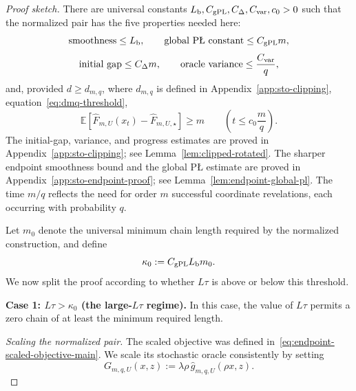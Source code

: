\documentclass[11pt]{article}
\newcommand{\E}{\mathbb{E}}
\begin{document}
\begin{proof}[Proof sketch]
There are universal constants \(L_{\rm b},C_{\mathrm{gPL}},C_\Delta,C_{\rm var},c_0>0\) such that the normalized pair has
the five properties needed here:
\begin{equation}
\label{eq:endpoint-normalized-geometry-main}
\text{smoothness}\le L_{\rm b},
\qquad
\text{global P\L{} constant}\le C_{\mathrm{gPL}}m,
\end{equation}
\begin{equation}
\label{eq:endpoint-normalized-oracle-main}
\text{initial gap}\le C_\Delta m,
\qquad
\text{oracle variance}\le \frac{C_{\rm var}}{q},
\end{equation}
and, provided $d\ge d_{m,q}$, where $d_{m,q}$ is defined in
Appendix~\ref{app:sto-clipping}, equation~\eqref{eq:dmq-threshold},
\begin{equation}
\label{eq:endpoint-normalized-barrier-main}
\E\!\left[\widehat F_{m,U}(x_t)-\widehat F_{m,U,\star}\right]\ge m
\qquad
\left(t\le c_0\frac{m}{q}\right).
\end{equation}
The initial-gap, variance, and progress estimates are proved in Appendix~\ref{app:sto-clipping}; see
Lemma~\ref{lem:clipped-rotated}. The sharper endpoint smoothness bound and the global P\L{} estimate are proved in
Appendix~\ref{app:sto-endpoint-proof}; see Lemma~\ref{lem:endpoint-global-pl}.
The time \(m/q\) reflects the need for order \(m\) successful coordinate revelations, each occurring with probability
\(q\).

Let $m_0$ denote the universal minimum chain length required by the normalized construction, and define
\begin{equation}
\label{eq:endpoint-kappa-threshold-main}
\kappa_0:=C_{\mathrm{gPL}}L_{\rm b}m_0.
\end{equation}
We now split the proof according to whether $L\tau$ is above or below this threshold.

\textbf{Case 1: $L\tau>\kappa_0$ (the large-$L\tau$ regime).}
In this case, the value of $L\tau$ permits a zero chain of at least the minimum required length.

\emph{Scaling the normalized pair.}
The scaled objective was defined in~\eqref{eq:endpoint-scaled-objective-main}. We scale its stochastic oracle
consistently by setting
\begin{equation}
\label{eq:endpoint-scaled-oracle-main}
G_{m,q,U}(x,z):=\lambda\rho\,\widehat g_{m,q,U}(\rho x,z).
\end{equation}


\end{proof}
\end{document}
